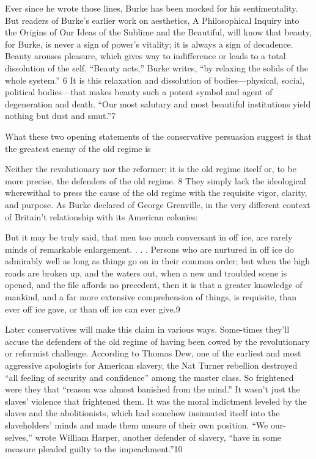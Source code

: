  \par 
Ever since he wrote those lines, Burke has been mocked for his sentimentality. But readers of Burke’s earlier work on aesthetics, A Philosophical Inquiry into the Origins of Our Ideas of the Sublime and the Beautiful, will know that beauty, for Burke, is never a sign of power’s vitality; it is always a sign of decadence. Beauty arouses pleasure, which gives way to indifference or leads to a total dissolution of the self. “Beauty acts,” Burke writes, “by relaxing the solids of the whole system.” {\color{blue}6} It is this relaxation and dissolution of bodies—physical, social, political bodies—that makes beauty such a potent symbol and agent of degeneration and death. “Our most salutary and most beautiful institutions yield nothing but dust and smut.”{\color{blue}7}
 \par 
What these two opening statements of the conservative persuasion suggest is that the greatest enemy of the old regime is
 \par 
Neither the revolutionary nor the reformer; it is the old regime itself or, to be more precise, the defenders of the old regime. {\color{blue}8} They simply lack the ideological wherewithal to press the cause of the old regime with the requisite vigor, clarity, and purpose. As Burke declared of George Grenville, in the very different context of Britain't relationship with its American colonies:
 \par 
But it may be truly said, that men too much conversant in off ice, are rarely minds of remarkable enlargement. . . . Persons who are nurtured in off ice do admirably well as long as things go on in their common order; but when the high roads are broken up, and the waters out, when a new and troubled scene is opened, and the file affords no precedent, then it is that a greater knowledge of mankind, and a far more extensive comprehension of things, is requisite, than ever off ice gave, or than off ice can ever give.{\color{blue}9}
 \par 
Later conservatives will make this claim in various ways. Some-times they’ll accuse the defenders of the old regime of having been cowed by the revolutionary or reformist challenge. According to Thomas Dew, one of the earliest and most aggressive apologists for American slavery, the Nat Turner rebellion destroyed “all feeling of security and confidence” among the master class. So frightened were they that “reason was almost banished from the mind.” It wasn’t just the slaves’ violence that frightened them. It was the moral indictment leveled by the slaves and the abolitionists, which had somehow insinuated itself into the slaveholders’ minds and made them unsure of their own position. “We our-selves,” wrote William Harper, another defender of slavery, “have in some measure pleaded guilty to the impeachment.”{\color{blue}10}
